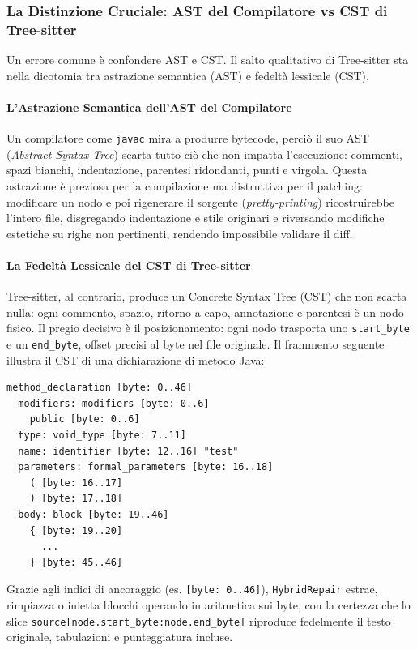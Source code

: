 \subsubsection{La Distinzione Cruciale: AST del Compilatore vs CST di Tree-sitter}
\label{subsubsec:3.4.5.3}
Un errore comune è confondere AST e CST. Il salto qualitativo di Tree-sitter sta nella dicotomia tra astrazione
semantica (AST) e fedeltà lessicale (CST).

\paragraph{L'Astrazione Semantica dell'AST del Compilatore}
Un compilatore come \texttt{javac} mira a produrre bytecode, perciò il suo AST (\textit{Abstract Syntax Tree})
scarta tutto ciò che non impatta l'esecuzione: commenti, spazi bianchi, indentazione, parentesi ridondanti, punti
e virgola. Questa astrazione è preziosa per la compilazione ma distruttiva per il patching: modificare un nodo e
poi rigenerare il sorgente (\textit{pretty-printing}) ricostruirebbe l'intero file, disgregando indentazione e
stile originari e riversando modifiche estetiche su righe non pertinenti, rendendo impossibile validare il diff.

\paragraph{La Fedeltà Lessicale del CST di Tree-sitter}
Tree-sitter, al contrario, produce un Concrete Syntax Tree (CST) che non scarta nulla: ogni commento, spazio,
ritorno a capo, annotazione e parentesi è un nodo fisico. Il pregio decisivo è il posizionamento: ogni nodo
trasporta uno \texttt{start\_byte} e un \texttt{end\_byte}, offset precisi al byte nel file originale. Il frammento
seguente illustra il CST di una dichiarazione di metodo Java:

\begin{verbatim}
method_declaration [byte: 0..46]
  modifiers: modifiers [byte: 0..6]
    public [byte: 0..6]
  type: void_type [byte: 7..11]
  name: identifier [byte: 12..16] "test"
  parameters: formal_parameters [byte: 16..18]
    ( [byte: 16..17]
    ) [byte: 17..18]
  body: block [byte: 19..46]
    { [byte: 19..20]
      ...
    } [byte: 45..46]
\end{verbatim}

Grazie agli indici di ancoraggio (es. \texttt{[byte: 0..46]}), \texttt{HybridRepair} estrae, rimpiazza o inietta
blocchi operando in aritmetica sui byte, con la certezza che lo slice
\texttt{source[node.start\_byte:node.end\_byte]} riproduce fedelmente il testo originale, tabulazioni e punteggiatura incluse.


